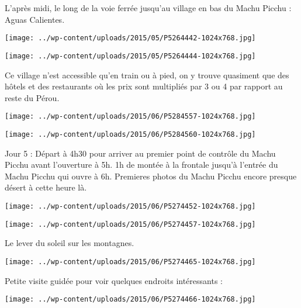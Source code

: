  L'après midi, le long de la voie ferrée jusqu'au village en bas du Machu Picchu : Aguas Calientes. \newline
 \newline
\centerline{\texttt{[image: ../wp-content/uploads/2015/05/P5264442-1024x768.jpg]} } 
 \newline
 \newline
\centerline{\texttt{[image: ../wp-content/uploads/2015/05/P5264444-1024x768.jpg]} } 
 \newline
 Ce village n'est accessible qu'en train ou à pied, on y trouve quasiment que des hôtels et des restaurants où les prix sont multipliés par 3 ou 4 par rapport au reste du Pérou. \newline
 \newline
\centerline{\texttt{[image: ../wp-content/uploads/2015/06/P5284557-1024x768.jpg]} } 
 \newline
 \newline
\centerline{\texttt{[image: ../wp-content/uploads/2015/06/P5284560-1024x768.jpg]} } 
 \newline
 Jour 5 : \newline
 Départ à 4h30 pour arriver au premier point de contrôle du Machu Picchu avant l'ouverture à 5h. \newline
 1h de montée à la frontale jusqu'à l'entrée du Machu Picchu qui ouvre à 6h. \newline
 Premieres photos du Machu Picchu encore presque désert à cette heure là. \newline
 \newline
\centerline{\texttt{[image: ../wp-content/uploads/2015/06/P5274452-1024x768.jpg]} } 
 \newline
 \newline
\centerline{\texttt{[image: ../wp-content/uploads/2015/06/P5274457-1024x768.jpg]} } 
 \newline
 Le lever du soleil sur les montagnes. \newline
 \newline
\centerline{\texttt{[image: ../wp-content/uploads/2015/06/P5274465-1024x768.jpg]} } 
 \newline
 Petite visite guidée pour voir quelques endroits intéressants : \newline
 \newline
\centerline{\texttt{[image: ../wp-content/uploads/2015/06/P5274466-1024x768.jpg]} } 
 \newline
